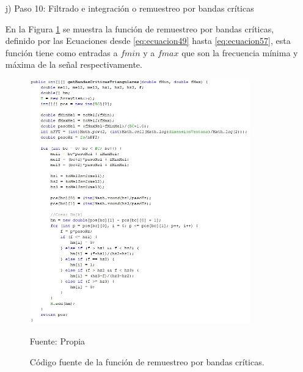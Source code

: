 \begin{enumerate}
\item[j)]Paso 10: Filtrado e integración o remuestreo por bandas críticas
\par
En la Figura \ref{fig:figura3.25} se muestra la función de remuestreo por bandas críticas, definido por las Ecuaciones desde \eqref{eq:ecuacion49} hasta \eqref{eq:ecuacion57}, esta función tiene como entradas a $fmin$ y a $fmax$ que son la frecuencia mínima y máxima de la señal respectivamente.
\begin{figure}[H]
\captionsetup{justification=centering}
\begin{center}
\includegraphics[width=0.9\textwidth]{Imagenes/Cap3/image025}
\end{center}
\begin{center}
\vskip -0.5cm
\caption{\small{Código fuente de la función de remuestreo por bandas críticas.}}
\label{fig:figura3.25}
{\small{Fuente: Propia}}
\end{center}
\end{figure}


\end{enumerate}
